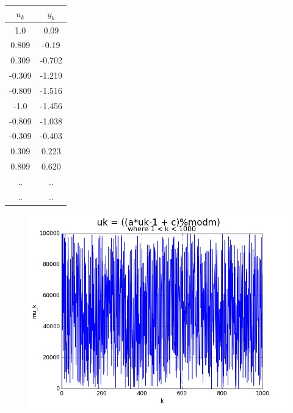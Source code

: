 \documentclass[a4paper,10pt]{article}
\begin{document}
\begin{center}
\begin{tabular}[!hbt]{| c | c |}
\hline
  \bf{$u_k$} & \bf{$y_k$} \\
  \hline
 1.0 & 0.09\\ 
 0.809 & -0.19\\  
 0.309 & -0.702 \\
 -0.309 & -1.219 \\
 -0.809 & -1.516 \\
 -1.0 & -1.456 \\
 -0.809 & -1.038 \\
 -0.309 & -0.403 \\
 0.309 & 0.223 \\
 0.809 & 0.620 \\
 .. & .. \\
 .. & .. \\
 \hline
\end{tabular}
\end{center}

\begin{center}
 \begin{figure}[!hbt]
  \includegraphics[scale=0.573]{figure_2.png}
 \end{figure}
\end{center}
\end{document}
